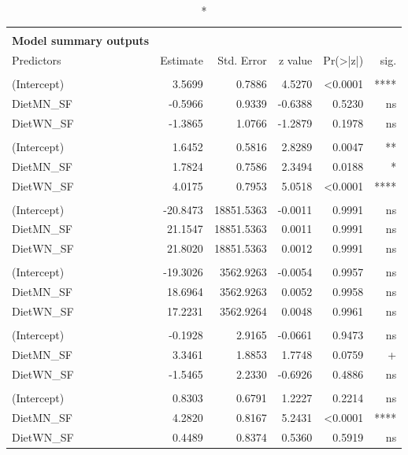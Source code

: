 \documentclass[
  12pt,
  letterpaper,
]{article}
\begin{document}
\begingroup
\fontsize{12.0pt}{14.4pt}\selectfont
\begin{longtable}{l|rrrrr}
\caption*{
{\large \textbf{Appendix Table 107}} \\ 
{\small \textbf{Model summary outputs}}
} \\ 
\toprule
Predictors & {Estimate} & {Std. Error} & {z value} & {Pr(>|z|)} & {sig.} \\ 
\midrule\addlinespace[2.5pt]
\multicolumn{6}{l}{Brain} \\[2.5pt] 
\midrule\addlinespace[2.5pt]
(Intercept) & 3.5699 & 0.7886 & 4.5270 & <0.0001 & **** \\ 
DietMN\_SF & -0.5966 & 0.9339 & -0.6388 & 0.5230 & ns \\ 
DietWN\_SF & -1.3865 & 1.0766 & -1.2879 & 0.1978 & ns \\ 
\midrule\addlinespace[2.5pt]
\multicolumn{6}{l}{Ear} \\[2.5pt] 
\midrule\addlinespace[2.5pt]
(Intercept) & 1.6452 & 0.5816 & 2.8289 & 0.0047 & ** \\ 
DietMN\_SF & 1.7824 & 0.7586 & 2.3494 & 0.0188 & * \\ 
DietWN\_SF & 4.0175 & 0.7953 & 5.0518 & <0.0001 & **** \\ 
\midrule\addlinespace[2.5pt]
\multicolumn{6}{l}{Eye} \\[2.5pt] 
\midrule\addlinespace[2.5pt]
(Intercept) & -20.8473 & 18851.5363 & -0.0011 & 0.9991 & ns \\ 
DietMN\_SF & 21.1547 & 18851.5363 & 0.0011 & 0.9991 & ns \\ 
DietWN\_SF & 21.8020 & 18851.5363 & 0.0012 & 0.9991 & ns \\ 
\midrule\addlinespace[2.5pt]
\multicolumn{6}{l}{Liver} \\[2.5pt] 
\midrule\addlinespace[2.5pt]
(Intercept) & -19.3026 & 3562.9263 & -0.0054 & 0.9957 & ns \\ 
DietMN\_SF & 18.6964 & 3562.9263 & 0.0052 & 0.9958 & ns \\ 
DietWN\_SF & 17.2231 & 3562.9264 & 0.0048 & 0.9961 & ns \\ 
\midrule\addlinespace[2.5pt]
\multicolumn{6}{l}{Paw} \\[2.5pt] 
\midrule\addlinespace[2.5pt]
(Intercept) & -0.1928 & 2.9165 & -0.0661 & 0.9473 & ns \\ 
DietMN\_SF & 3.3461 & 1.8853 & 1.7748 & 0.0759 & + \\ 
DietWN\_SF & -1.5465 & 2.2330 & -0.6926 & 0.4886 & ns \\ 
\midrule\addlinespace[2.5pt]
\multicolumn{6}{l}{Spleen} \\[2.5pt] 
\midrule\addlinespace[2.5pt]
(Intercept) & 0.8303 & 0.6791 & 1.2227 & 0.2214 & ns \\ 
DietMN\_SF & 4.2820 & 0.8167 & 5.2431 & <0.0001 & **** \\ 
DietWN\_SF & 0.4489 & 0.8374 & 0.5360 & 0.5919 & ns \\ 
\bottomrule
\end{longtable}
\endgroup
\end{document}

